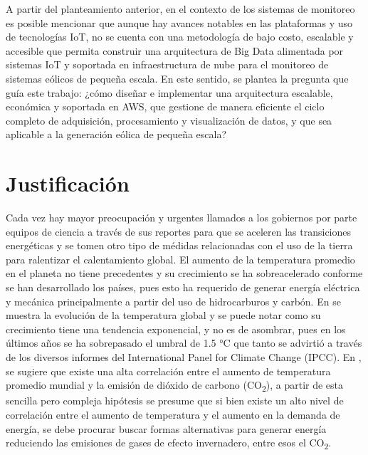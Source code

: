 \documentclass[letterpaper,12pt, oneside]{book}
\begin{document}
A partir del planteamiento anterior, en el contexto de los sistemas de monitoreo es posible mencionar que aunque hay avances notables en las plataformas y uso de tecnologías IoT, no se cuenta con una metodología de bajo costo, escalable y accesible que permita construir una arquitectura de Big Data alimentada por sistemas IoT y soportada en infraestructura de nube para el monitoreo de sistemas eólicos de pequeña escala. En este sentido, se plantea la pregunta que guía este trabajo: ¿cómo diseñar e implementar una arquitectura escalable, económica y soportada en AWS, que gestione de manera eficiente el ciclo completo de adquisición, procesamiento y visualización de datos, y que sea aplicable a la generación eólica de pequeña escala?

\section{Justificación} \label{sec3}

Cada vez hay mayor preocupación y urgentes llamados a los gobiernos por parte equipos de ciencia a través de sus reportes para que se aceleren las transiciones energéticas y se tomen otro tipo de médidas relacionadas con el uso de la tierra para ralentizar el calentamiento global. El aumento de la temperatura promedio en el planeta no tiene precedentes y su crecimiento se ha sobreacelerado conforme se han desarrollado los países, pues esto ha requerido de generar energía eléctrica y mecánica principalmente a partir del uso de hidrocarburos y carbón. En \cite{ref13} se muestra la evolución de la temperatura global y se puede notar como su crecimiento tiene una tendencia exponencial, y no es de asombrar, pues en los últimos años se ha sobrepasado el umbral de 1.5 °C que tanto se advirtió a través de los diversos informes del International Panel for Climate Change (IPCC). En \cite{ref14}, se sugiere que existe una alta correlación entre el aumento de temperatura promedio mundial y la emisión de dióxido de carbono (CO\textsubscript{2}), a partir de esta sencilla pero compleja hipótesis se presume que si bien existe un alto nivel de correlación entre el aumento de temperatura y el aumento en la demanda de energía, se debe procurar buscar formas alternativas para generar energía reduciendo las emisiones de gases de efecto invernadero, entre esos el CO\textsubscript{2}. 
\end{document}
